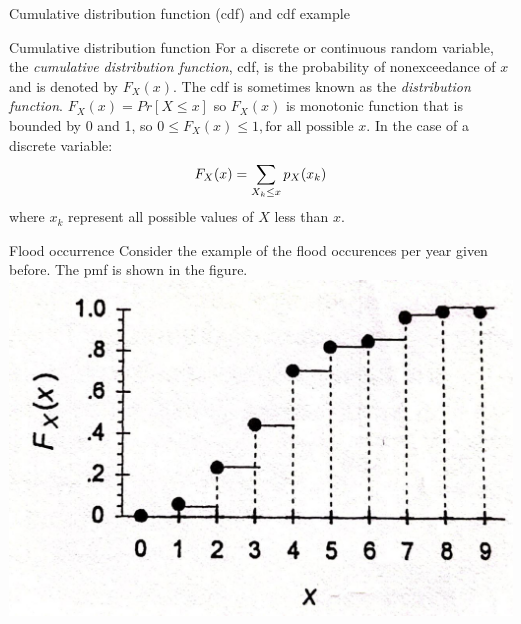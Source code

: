 \documentclass[8pt]{beamer}
\begin{document}
\begin{frame}{Cumulative distribution function (cdf) and cdf example} 
    \begin{block}{Cumulative distribution function}
        For a discrete or continuous random variable, the \emph{cumulative distribution function}, cdf, is the probability of nonexceedance of $x$ and is denoted by $F_X (x)$. The cdf is sometimes known as the \emph{distribution function}. $F_X (x) = Pr[X \leq x]$ so $F_X (x)$ is monotonic function that is bounded by 0 and 1, so $0 \leq F_X (x) \leq 1, \text{for all possible } x$. In the case of a discrete variable:
        \vspace{-9pt}
        $$
        F_X (x) = \sum_{ X_k \leq x } p_X(x_k)
        \vspace{-7pt}
        $$
        where $x_k$ represent all possible values of $X$ less than $x$. 
    \end{block}

    \begin{exampleblock}{Flood occurrence}
        Consider the example of the flood occurences per year given before. The pmf is shown in the figure.
            \includegraphics[width=\linewidth]{fi312.jpeg}
    \end{exampleblock}    
\end{frame}
\end{document}
